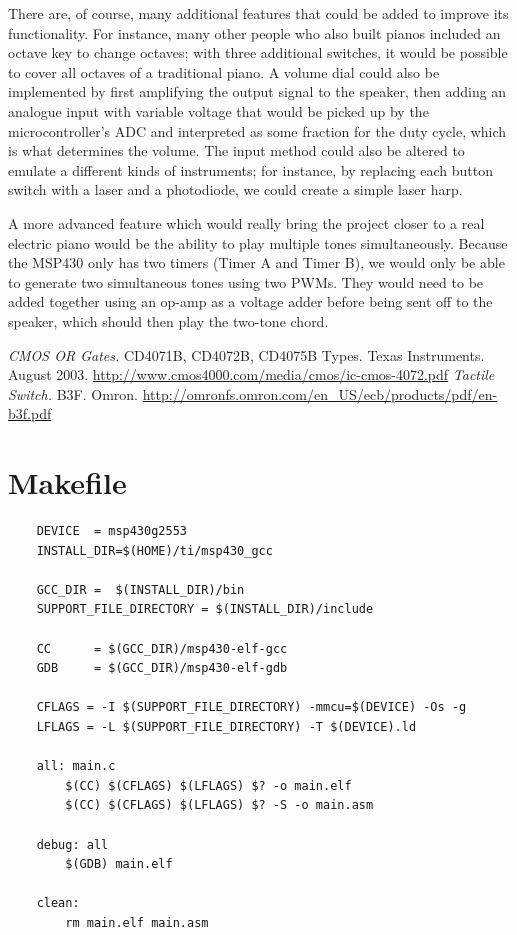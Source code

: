 \documentclass[letterpaper]{report}
\begin{document}
		There are, of course, many additional features that could be added to improve its functionality. For instance, many other people who also built pianos included an octave key to change octaves; with three additional switches, it would be possible to cover all octaves of a traditional piano. A volume dial could also be implemented by first amplifying the output signal to the speaker, then adding an analogue input with variable voltage that would be picked up by the microcontroller's ADC and interpreted as some fraction for the duty cycle, which is what determines the volume. The input method could also be altered to emulate a different kinds of instruments; for instance, by replacing each button switch with a laser and a photodiode, we could create a simple laser harp. 
		
		A more advanced feature which would really bring the project closer to a real electric piano would be the ability to play multiple tones simultaneously. Because the MSP430 only has two timers (Timer A and Timer B), we would only be able to generate two simultaneous tones using two PWMs. They would need to be added together using an op-amp as a voltage adder before being sent off to the speaker, which should then play the two-tone chord.
			
	\renewcommand\bibname{References}
	\begin{thebibliography}{9}
			\textit{CMOS OR Gates.}
			CD4071B, CD4072B, CD4075B Types.
			Texas Instruments. 
			August 2003.
			\url{http://www.cmos4000.com/media/cmos/ic-cmos-4072.pdf}
			\textit{Tactile Switch.}
			B3F.
			Omron.
			\url{http://omronfs.omron.com/en_US/ecb/products/pdf/en-b3f.pdf}
	\end{thebibliography}
	
	\appendix
	\chapter{Makefile}
		\begin{verbatim}
    DEVICE  = msp430g2553
    INSTALL_DIR=$(HOME)/ti/msp430_gcc
    
    GCC_DIR =  $(INSTALL_DIR)/bin
    SUPPORT_FILE_DIRECTORY = $(INSTALL_DIR)/include
    
    CC      = $(GCC_DIR)/msp430-elf-gcc
    GDB     = $(GCC_DIR)/msp430-elf-gdb
    
    CFLAGS = -I $(SUPPORT_FILE_DIRECTORY) -mmcu=$(DEVICE) -Os -g
    LFLAGS = -L $(SUPPORT_FILE_DIRECTORY) -T $(DEVICE).ld
    
    all: main.c
        $(CC) $(CFLAGS) $(LFLAGS) $? -o main.elf
        $(CC) $(CFLAGS) $(LFLAGS) $? -S -o main.asm
    
    debug: all
        $(GDB) main.elf
    
    clean:
        rm main.elf main.asm
		\end{verbatim}
		
\end{document}

